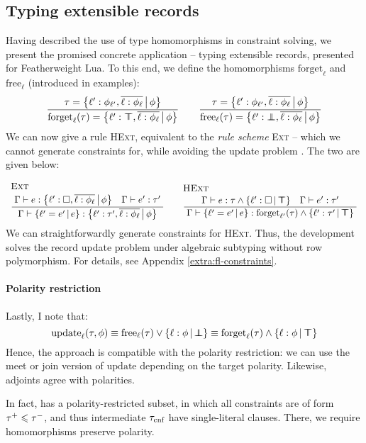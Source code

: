 \subsection{Typing extensible records}
\label{subsec:breaking-records}
Having described the use of type homomorphisms in constraint solving, we present the promised concrete application -- typing extensible records, presented for Featherweight Lua. To this end, we define the homomorphisms $\mathrm{forget}_\ell$ and $\mathrm{free}_\ell$ (introduced in examples):
$$ 
\dfrac
  {\tau = \flext{\ell' : \phi_{\ell'},  \overline{\ell : \phi_\ell}}{\phi}}
  {\mathrm{forget}_\ell(\tau) = \flext{\ell' : \flftop,  \overline{\ell : \phi_\ell}}{\phi}}
\qquad 
\dfrac
  {\tau = \flext{\ell' : \phi_{\ell'},  \overline{\ell : \phi_\ell}}{\phi}}
  {\mathrm{free}_\ell(\tau) = \flext{\ell' : \flfbot,  \overline{\ell : \phi_\ell}}{\phi}}
$$
We can now give a rule \textsc{HExt}, equivalent to the \emph{rule scheme} \textsc{Ext} -- which we cannot generate constraints for, while avoiding the update problem \cite{operations-on-records}. The two are given below:
$$
\irule{Ext}
    {\Gamma \vdash e : \flext{\ell' : \flabsent, \overline{\ell : \phi_\ell}}{\phi} \quad \Gamma \vdash e' : \tau'}
    {\Gamma \vdash \flext{\ell' = e'}{e} : \flext{\ell' : \tau', \overline{\ell : \phi_\ell}}{\phi}}
\quad 
\irule{HExt}{\Gamma \vdash e : \tau \meet \flext{\ell' : \flabsent}{\flftop} \quad \Gamma \vdash e' : \tau'}{\Gamma \vdash \flext{\ell' = e'}{e} : \mathrm{forget}_{\ell'}(\tau) \meet \flext{\ell' : \tau'}{\flftop}}
$$
We can straightforwardly generate constraints for 
\textsc{HExt}.
Thus, the development solves the record update problem under algebraic subtyping without row polymorphism. For details, see Appendix \ref{extra:fl-constraints}.

\paragraph{Polarity restriction} Lastly, I note that:
$$ \mathrm{update}_\ell(\tau, \phi) \equiv \mathrm{free}_\ell(\tau) \join \flext{ \ell : \phi }{\flfbot} \equiv \mathrm{forget}_\ell(\tau) \meet \flext{ \ell : \phi }{\flftop}  $$ 
Hence, the approach is compatible with the polarity restriction: we can use the meet or join version of $\mathrm{update}$ depending on the target polarity. Likewise, adjoints agree with polarities.

In fact, \inference{} has a polarity-restricted subset, in which all constraints are of form $\tau^+ \leqslant \tau^-$, and thus intermediate $\tau_\text{cnf}$ have single-literal clauses. There, we require homomorphisms preserve polarity.

